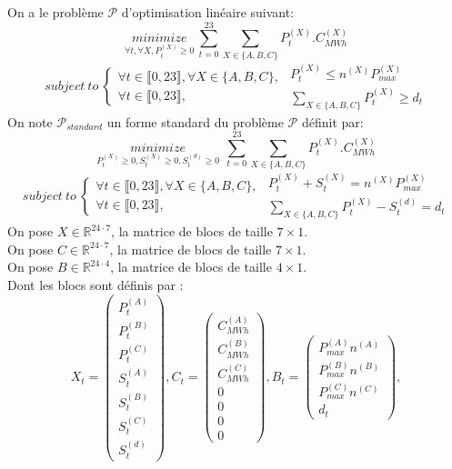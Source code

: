 \documentclass{article}
\begin{document}
On a le problème $\mathcal{P}$ d'optimisation linéaire suivant:
$$
\underset{\forall t, \forall X, P_t^{(X)}\geq 0}{minimize}~ \sum_{t=0}^{23}\sum_{X\in\{A,B,C\}} P_t^{(X)}.C_{MWh}^{(X)}
$$
$$
subject~to~ 
\left\{\begin{array}{l}
\forall t \in \llbracket 0,23 \rrbracket,\forall X \in \{A,B,C\},  \\ 
\forall t \in \llbracket 0,23 \rrbracket,  
\end{array}\right.
\left.\begin{array}{l}
P_t^{(X)} \leq n^{(X)} P_{max}^{(X)} \\ 
\underset{X \in \{A,B,C\}}{\sum} P_t^{(X)}\geq d_t
\end{array}\right.
$$
On note $\mathcal{P}_{standard}$ un forme standard du problème $\mathcal{P}$ définit par:\\
$$
\underset{P_t^{(X)}\geq 0, S_t^{(X)}\geq 0,S_t^{(d)}\geq 0}{minimize}~~ \sum_{t=0}^{23}\sum_{X\in\{A,B,C\}} P_t^{(X)}.C_{MWh}^{(X)}
$$
$$
subject~to~ 
\left\{\begin{array}{l}
\forall t \in \llbracket 0,23 \rrbracket,\forall X \in \{A,B,C\},  \\ 
\forall t \in \llbracket 0,23 \rrbracket,  
\end{array}\right.
\left.\begin{array}{l}
P_t^{(X)} + S_t^{(X)} = n^{(X)} P_{max}^{(X)} \\ 
\underset{X \in \{A,B,C\}}{\sum} P_t^{(X)} - S_t^{(d)} =  d_t
\end{array}\right.
$$
On pose $X\in \mathbb{R}^{24\cdot7}$, la matrice de blocs de taille $7\times1$.\\
On pose $C\in \mathbb{R}^{24\cdot7}$, la matrice de blocs de taille $7\times1$.\\
On pose $B\in \mathbb{R}^{24\cdot4}$, la matrice de blocs de taille $4\times1$.\\
Dont les blocs sont définis par :
$$
X_t = \left(
\begin{array}{ccccccc}
    P^{(A)}_t\\P^{(B)}_t\\P^{(C)}_t\\S^{(A)}_t\\S^{(B)}_t\\S^{(C)}_t\\S^{(d)}_t
\end{array}
\right),
C_t =\left(
\begin{array}{ccccccc}
    C_{MWh}^{(A)}\\C_{MWh}^{(B)}\\C_{MWh}^{(C)}\\0\\0\\0\\0
\end{array}
\right),
B_t =\left(
\begin{array}{ccccccc}
    P^{(A)}_{max}n^{(A)}\\P^{(B)}_{max}n^{(B)}\\P^{(C)}_{max}n^{(C)}\\d_t
\end{array}
\right),
$$
\end{document}
